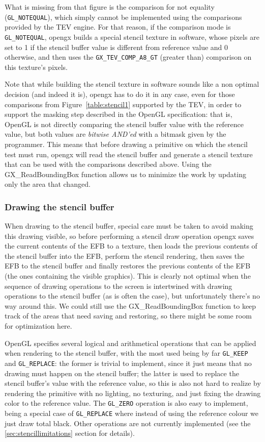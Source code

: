 \documentclass[12pt]{article}
\newcommand{\fname}[1] {{\color{blue}#1}}
\begin{document}
What is missing from that figure is the comparison for not equality (\lstinline{GL_NOTEQUAL}), which simply cannot be implemented using the comparisons provided by the TEV engine. For that reason, if the comparison mode is \lstinline{GL_NOTEQUAL}, opengx builds a special stencil texture in software, whose pixels are set to 1 if the stencil buffer value is different from reference value and 0 otherwise, and then uses the \lstinline{GX_TEV_COMP_A8_GT} (greater than) comparison on this texture's pixels.

Note that while building the stencil texture in software sounds like a non optimal decision (and indeed it is), opengx has to do it in any case, even for those comparisons from Figure~\ref{table:stencil1} supported by the TEV, in order to support the masking step described in the OpenGL specification: that is, OpenGL is not directly comparing the stencil buffer value with the reference value, but both values are \emph{bitwise AND'ed} with a bitmask given by the programmer. This means that before drawing a primitive on which the stencil test must run, opengx will read the stencil buffer and generate a stencil texture that can be used with the comparisons described above. Using the \fname{GX\_ReadBoundingBox} function allows us to minimize the work by updating only the area that changed.

\subsubsection {Drawing the stencil buffer}

When drawing to the stencil buffer, special care must be taken to avoid making this drawing visible, so before performing a stencil draw operation opengx saves the current contents of the EFB to a texture, then loads the previous contents of the stencil buffer into the EFB, perform the stencil rendering, then saves the EFB to the stencil buffer and finally restores the previous contents of the EFB (the ones containing the visible graphics). This is clearly not optimal when the sequence of drawing operations to the screen is intertwined with drawing operations to the stencil buffer (as is often the case), but unfortunately there's no way around this. We could still use the \fname{GX\_ReadBoundingBox} function to keep track of the areas that need saving and restoring, so there might be some room for optimization here.

OpenGL specifies several logical and arithmetical operations that can be applied when rendering to the stencil buffer, with the most used being by far \lstinline{GL_KEEP} and \lstinline{GL_REPLACE}: the former is trivial to implement, since it just means that no drawing must happen on the stencil buffer; the latter is used to replace the stencil buffer's value with the reference value, so this is also not hard to realize by rendering the primitive with no lighting, no texturing, and just fixing the drawing color to the reference value. The \lstinline{GL_ZERO} operation is also easy to implement, being a special case of \lstinline{GL_REPLACE} where instead of using the reference colour we just draw total black. Other operations are not currently implemented (see the \ref{sec:stencillimitations} section for details).
\end{document}
